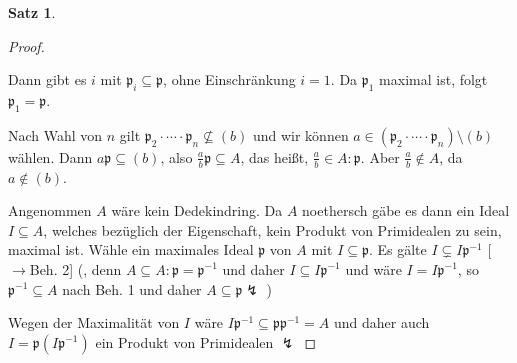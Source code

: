 \documentclass[
twoside=semi,
fontsize=12,
DIV=12, 
cleardoublepage=current,
leqno,
headings=optiontoheadandtoc, 
toc=idx
]{scrbook}
\theoremstyle{definition}
\newtheorem{satz}[definition]{Satz}
\begin{document}
\begin{satz}
\begin{proof}
\begin{tcolorbox}[colback=white,colframe=blue,arc=0cm]
	   			\noindent Dann gibt es $i$ mit $\mathfrak{p}_i \subseteq \mathfrak{p}$, ohne Einschr\"ankung $i = 1$. Da $\mathfrak{p}_1$ maximal ist, folgt $\mathfrak{p}_1 = \mathfrak{p}$.
	   			
	   			\noindent Nach Wahl von $n$ gilt $\mathfrak{p}_2 \cdot \cdots \cdot \mathfrak{p}_n \nsubseteq (b)$ und wir k\"onnen $a \in (\mathfrak{p}_2 \cdot \cdots \cdot \mathfrak{p}_n) \setminus (b)$ w\"ahlen. Dann $a\mathfrak{p} \subseteq (b)$, also $\frac{a}{b}\mathfrak{p} \subseteq A$, das hei\ss t, $\frac{a}{b} \in A: \mathfrak{p}$. Aber $\frac{a}{b} \notin A$, da $a \notin (b)$.
			\end{tcolorbox}
		
			\medskip\noindent
			Angenommen $A$ w\"are kein Dedekindring. Da $A$ noethersch g\"abe es dann ein Ideal $I \subseteq A$, welches bez\"uglich der Eigenschaft, kein Produkt von Primidealen zu sein, maximal ist. W\"ahle ein maximales Ideal $\mathfrak{p}$ von $A$ mit $I \subseteq \mathfrak{p}$. Es g\"alte $I \subsetneq I \mathfrak{p}^{-1}$ [$\rightarrow$Beh. 2] (, denn $A \subseteq A: \mathfrak{p} = \mathfrak{p}^{-1}$ und daher $I \subseteq I\mathfrak{p}^{-1}$ und w\"are $I = I\mathfrak{p}^{-1}$, so $\mathfrak{p}^{-1} \subseteq A$ nach Beh. 1 und daher $A \subseteq \mathfrak{p} \lightning$ ) 
			
			\noindent Wegen der Maximalit\"at von $I$ w\"are $I\mathfrak{p}^{-1} \subseteq \mathfrak{p}\mathfrak{p}^{-1} = A$ und daher auch $I = \mathfrak{p}(I\mathfrak{p}^{-1})$ ein Produkt von Primidealen $\lightning$
   		\end{proof}
   	\end{satz}
   	\newpage
   	
\end{document}
